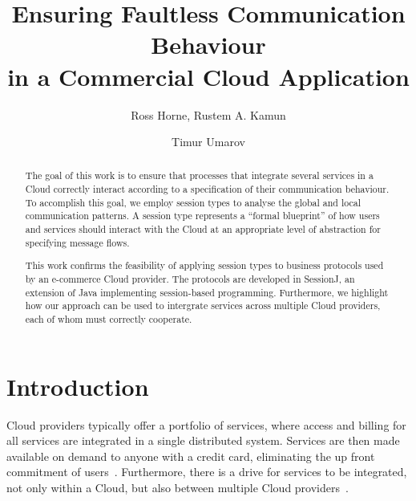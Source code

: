 \documentclass[10pt]{llncs}
\title{Ensuring Faultless Communication Behaviour\\
       in a Commercial Cloud Application}
\author{
	Ross Horne, Rustem A. Kamun \and Timur Umarov
}
\institute{
  Faculty of Information Technology, Kazakh-British Technical University, 
  Almaty, Kazakhstan
  \email{ross.horne@gmail.com \quad r.kamun@gmail.com \quad t.umarov@kbtu.kz}
}
\begin{document}
\maketitle

\begin{abstract}
The goal of this work is to ensure that processes that integrate several services in a Cloud correctly interact according to a specification of their communication behaviour. To accomplish this goal, we employ session types to analyse the global and local communication patterns. A session type represents a ``formal blueprint'' of how users and services should interact with the Cloud at an appropriate level of abstraction for specifying message flows.
 
This work confirms the feasibility of applying session types to business protocols used by an e-commerce Cloud provider. The protocols are developed in SessionJ, an extension of Java implementing session-based programming. Furthermore, we highlight how our approach can be used to intergrate services across multiple Cloud providers, each of whom must correctly cooperate.
\end{abstract}

\setcounter{tocdepth}{2}

\pagestyle{empty}


\section{Introduction}
\label{sect:introduction}

Cloud providers typically offer a portfolio of services, where access and billing for all services are integrated in a single distributed system. %
Services are then made available on demand to anyone with a credit card, eliminating the up front commitment of users~\cite{Armbrust2010}.
Furthermore, there is a drive for services to be integrated, not only within a Cloud, but also between multiple Cloud providers~\cite{utility-driven-fed}. %
\end{document}

